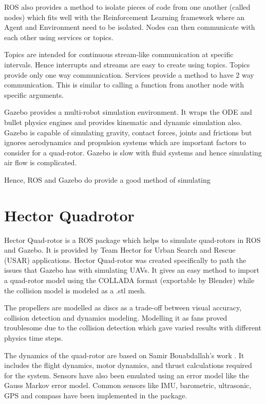 \documentclass[BTech]{iitmdiss}
\begin{document}
ROS also provides a method to isolate pieces of code from one another (called nodes) which fits well with the Reinforcement Learning framework where an Agent and Environment need to be isolated. Nodes can then communicate with each other using services or topics.

Topics are intended for continuous stream-like communication at specific intervals. Hence interrupts and streams are easy to create using topics. Topics provide only one way communication. Services provide a method to have 2 way communication. This is similar to calling a function from another node with specific arguments.

Gazebo provides a multi-robot simulation environment. It wraps the ODE and bullet physics engines and provides kinematic and dynamic simulation also. Gazebo is capable of simulating gravity, contact forces, joints and frictions but ignores aerodynamics and propulsion systems which are important factors to consider for a quad-rotor. Gazebo is slow with fluid systems and hence simulating air flow is complicated.

Hence, ROS and Gazebo do provide a good method of simulating

\section{Hector Quadrotor}

Hector Quad-rotor \cite{HectorQuadrotor} is a ROS package which helps to simulate quad-rotors in ROS and Gazebo. It is provided by Team Hector for Urban Search and Rescue (USAR) applications. Hector Quad-rotor was created specifically to path the issues that Gazebo has with simulating UAVs. It gives an easy method to import a quad-rotor model using the COLLADA format (exportable by Blender) while the collision model is modeled as a .stl mesh.

The propellers are modelled as discs as a trade-off between visual accuracy, collision detection and dynamics modeling. Modelling it as fans proved troublesome due to the collision detection which gave varied results with different physics time steps.

The dynamics of the quad-rotor are based on Samir Bouabdallah's work \cite{QuadrotorDynamics}. It includes the flight dynamics, motor dynamics, and thrust calculations required for the system. Sensors have also been emulated using an error model like the Gauss Markov error model. Common sensors like IMU, barometric, ultrasonic, GPS and compass have been implemented in the package.
\end{document}
